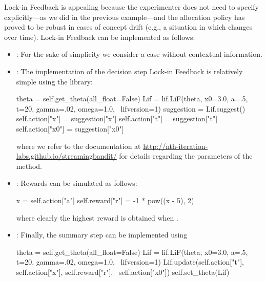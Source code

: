 \documentclass[nojss]{jss}
\begin{document}
Lock-in Feedback is appealing because the experimenter does not need to specify  explicitly---as we did in the previous example---and the allocation policy has proved to be robust in cases of concept drift (e.g., a situation in which  changes over time). Lock-in Feedback can be implemented as follows:
\begin{itemize}
\item {}: For the sake of simplicity we consider a case without contextual information.
\item {}: The implementation of the decision step Lock-in Feedback is relatively simple using the  library:
\begin{Code}
theta = self.get_theta(all_float=False)
Lif = lif.LiF(theta, x0=3.0, a=.5, t=20, gamma=.02, omega=1.0, \
  lifversion=1)
suggestion = Lif.suggest()
self.action["x"] = suggestion["x"]
self.action["t"] = suggestion["t"]
self.action["x0"] = suggestion["x0"]
\end{Code}
where we refer to the  documentation at \url{http://nth-iteration-labs.github.io/streamingbandit/} for details regarding the parameters of the  method. 

\item {}: Rewards can be simulated as follows:
\begin{Code}
x = self.action["a"]
self.reward["r"] = -1 * pow((x - 5), 2)
\end{Code}
where clearly the highest reward is obtained when .

\item {}: Finally, the summary step can be implemented using
\begin{Code}
theta = self.get_theta(all_float=False)
Lif = lif.LiF(theta, x0=3.0, a=.5, t=20, gamma=.02, omega=1.0, \
  lifversion=1)
Lif.update(self.action["t"], self.action["x"], self.reward["r"], \
  self.action["x0"])
self.set_theta(Lif)
\end{Code}

\end{itemize}
\end{document}
